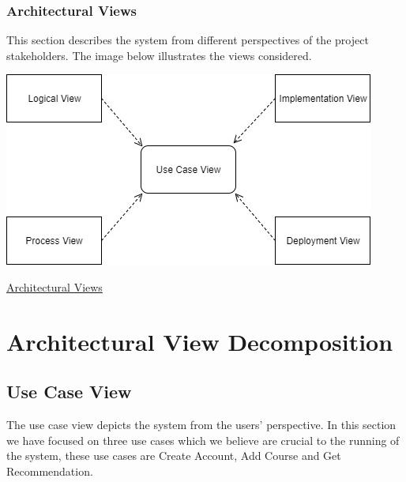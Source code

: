 \documentclass[10pt]{article}
\begin{document}
\newpage

\subsubsection{Architectural Views}
This section describes the system from different perspectives of the project stakeholders. The image below illustrates the views considered.
\begin{center}
\includegraphics[width=.9\textwidth]{architecture_views.png}
\end{center}
\caption{\underline{Architectural Views}}

\section{Architectural View Decomposition}

\subsection{Use Case View}

The use case view depicts the system from the users’ perspective. In this section we have focused on three use cases which we believe are crucial to the running of the system, these use cases are Create Account, Add Course and Get Recommendation.
\end{document}
